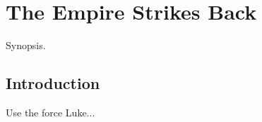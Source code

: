 
\chapter{The Empire Strikes Back}
	\label{chapter:empire-strikes-back}%



\begin{synopsis}
	Synopsis.
\end{synopsis}


\section{Introduction}

Use the force Luke...

